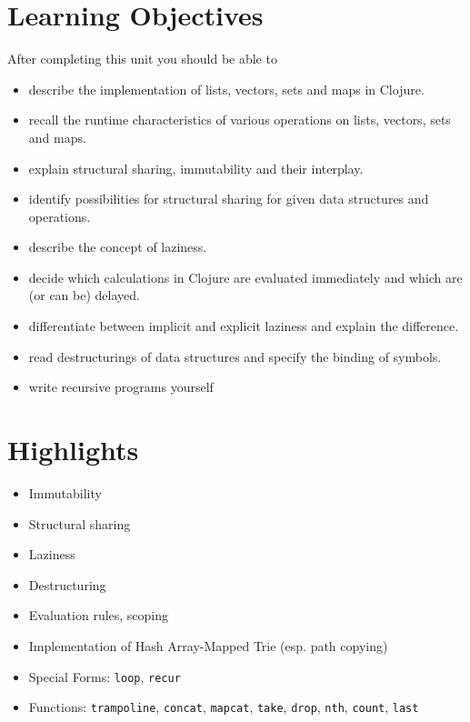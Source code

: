 \documentclass[11pt,a4paper]{article}
\begin{document}
\section{Learning Objectives}

After completing this unit you should be able to

\begin{itemize}
	\item describe the implementation of lists, vectors, sets and maps in Clojure.
    \item recall the runtime characteristics of various operations on lists, vectors, sets and maps.
    \item explain structural sharing, immutability and their interplay.
    \item identify possibilities for structural sharing for given data structures and operations.
    \item describe the concept of laziness.
    \item decide which calculations in Clojure are evaluated immediately and which are (or can be) delayed.
    \item differentiate between implicit and explicit laziness and explain the difference.
    \item read destructurings of data structures and specify the binding of symbols.
    \item write recursive programs yourself
\end{itemize}

\section{Highlights}

\begin{itemize}
    \item Immutability
    \item Structural sharing
    \item Laziness
    \item Destructuring
    \item Evaluation rules, scoping
    \item Implementation of Hash Array-Mapped Trie (esp. path copying)
    \item Special Forms: \verb|loop|, \verb|recur|
    \item Functions: \verb|trampoline|, \verb|concat|, \verb|mapcat|, \verb|take|, \verb|drop|, \verb|nth|, \verb|count|, \verb|last|
\end{itemize}
\end{document}

